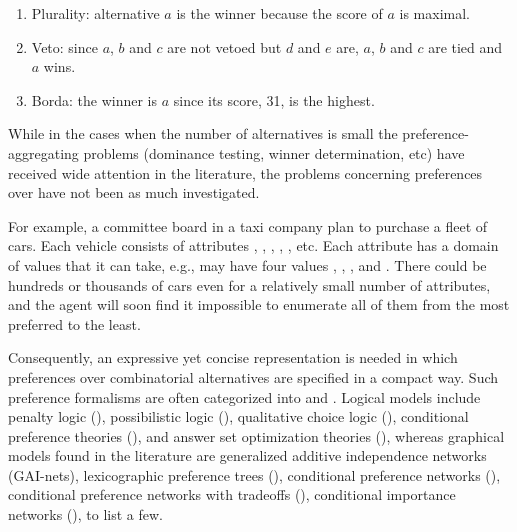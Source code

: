 	\begin{enumerate}  \itemsep -4pt
		\item Plurality: alternative $a$ is the winner because the score of $a$ is maximal.
		\item Veto: since $a$, $b$ and $c$ are not vetoed but $d$ and $e$ are, 
					$a$, $b$ and $c$ are tied and $a$ wins.
		\item Borda: the winner is $a$ since its score, 31, is the highest.
	\end{enumerate}


While in the cases when the
number of alternatives is small the preference-aggregating 
problems (dominance testing, winner determination,
etc) have received wide attention in the literature,
the problems concerning preferences over  have not been as much investigated.

For example, a committee board in a taxi company plan to purchase a fleet of
cars.
Each vehicle consists of attributes , ,
, , , etc.  
Each attribute has a domain of values that it can take, e.g.,
 may have four values , , , and .
There could be hundreds or thousands of cars even for
a relatively small number of attributes, and
the agent will soon find it impossible to enumerate all of
them from the most preferred to the least.

Consequently, an expressive yet concise representation is needed in which
preferences over combinatorial alternatives are specified
in a compact way.
Such preference formalisms are often categorized into  and
.
Logical models include penalty logic ()\cite{haddawy1992representations}, 
possibilistic logic ()\cite{DuboisLP91},
qualitative choice logic ()\cite{brewka2004qualitative},
conditional preference theories ()\cite{Wilson04extendingcp-nets},
and answer set optimization theories ()\cite{Brewka:ASO},
whereas graphical models found in the literature are
generalized additive independence networks (GAI-nets)\cite{BacchusG95,LIP61766},
lexicographic preference trees ()\cite{booth:learningLP,conf/adt13/LiuT},
conditional preference networks ()\cite{Kaci:Pref},
conditional preference networks with tradeoffs ()\cite{BrafmanD02:TCP},
conditional importance networks ()\cite{Kaci:Pref},
to list a few.

